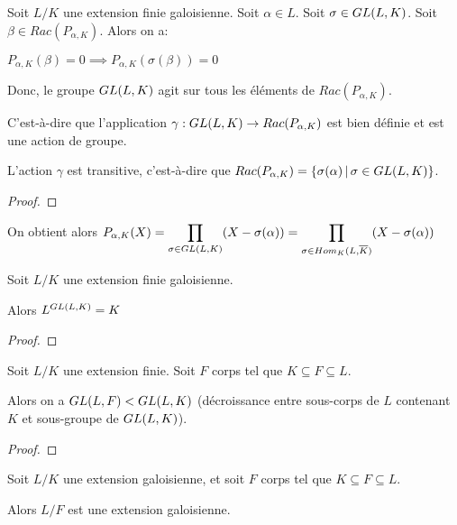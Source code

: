Soit $L/K$ une extension finie galoisienne. Soit $\alpha \in L$.
Soit $\sigma \in GL(L, K)$.
Soit $\beta \in Rac(P_{\alpha, K})$.
Alors on a:

$P_{\alpha, K}(\beta) = 0 \implies P_{\alpha, K}(\sigma(\beta)) = 0$

Donc, le groupe $GL(L, K)$ agit sur tous les éléments de
$Rac(P_{\alpha, K})$.

C'est-à-dire que l'application
$\gamma : GL(L, K) \rightarrow Rac(P_{\alpha, K})$ est bien définie
et est une action de groupe.

\begin{proposition}
	L'action $\gamma$ est transitive, c'est-à-dire que $Rac(P_{\alpha, K}) =
	\left\{\sigma(\alpha) \, | \, \sigma \in GL(L, K) \right\}$.
\end{proposition}

\ifdefined\outputproof
\begin{proof}

\end{proof}
\fi

On obtient alors $P_{\alpha, K}(X) = \displaystyle \prod_{\sigma \in
	GL(L, K)} (X - \sigma(\alpha)) = \displaystyle \prod_{\sigma \in
		Hom_{K}(L, \overline{K})} (X - \sigma(\alpha))$

\begin{theorem}
	Soit $L/K$ une extension finie galoisienne.

	Alors $L^{GL(L, K)} = K$
\end{theorem}

\ifdefined\outputproof
\begin{proof}

\end{proof}
\fi

\begin{proposition}
	Soit $L/K$ une extension finie.
	Soit $F$ corps tel que $K \subseteq F \subseteq L$.

	Alors on a $GL(L, F) < GL(L, K)$ (décroissance entre
	sous-corps de $L$ contenant $K$ et sous-groupe de $GL(L, K)$).
\end{proposition}

\ifdefined\outputproof
\begin{proof}

\end{proof}
\fi

\begin{proposition}
	Soit $L/K$ une extension galoisienne, et soit $F$ corps tel que $K \subseteq
	F \subseteq L$.

	Alors $L/F$ est une extension galoisienne.
\end{proposition}

